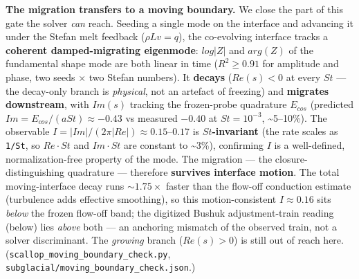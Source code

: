 \documentclass[tc, manuscript]{copernicus}
\begin{document}
\textbf{The migration transfers to a moving boundary.} We close the part of this gate the solver \emph{can} reach. Seeding a single mode on the interface and advancing it under the Stefan melt feedback ($\rho L v=q$), the co-evolving interface tracks a \textbf{coherent damped-migrating eigenmode}: $log|Z|$ and $arg(Z)$ of the fundamental shape mode are both linear in time ($R^{2}\ge 0.91$ for amplitude and phase, two seeds \ensuremath{\times} two Stefan numbers). It \textbf{decays} ($Re(s)<0$ at every $St$ — the decay-only branch is \emph{physical}, not an artefact of freezing) and \textbf{migrates downstream}, with $Im(s)$ tracking the frozen-probe quadrature $E_{cos}$ (predicted $Im=E_{cos}/(aSt)\approx -0.43$ vs measured $-0.40$ at $St=10^{-3}$, \textasciitilde{}5–10\%). The observable $I=|Im|/(2\pi |Re|)\approx 0.15\mbox{--}0.17$ is \textbf{$St$-invariant} (the rate scales as \texttt{1/\allowbreak{}St}, so $Re\cdot St$ and $Im\cdot St$ are constant to \textasciitilde{}3\%), confirming $I$ is a well-defined, normalization-free property of the mode. The migration — the closure-distinguishing quadrature — therefore \textbf{survives interface motion}. The total moving-interface decay runs $\sim 1.75\times $ faster than the flow-off conduction estimate (turbulence adds effective smoothing), so this motion-consistent $I\approx 0.16$ sits \emph{below} the frozen flow-off band; the digitized Bushuk adjustment-train reading (below) lies \emph{above} both — an anchoring mismatch of the observed train, not a solver discriminant. The \emph{growing} branch ($Re(s)>0$) is still out of reach here. (\texttt{scallop\_\allowbreak{}moving\_\allowbreak{}boundary\_\allowbreak{}check.\allowbreak{}py}, \texttt{subglacial/\allowbreak{}moving\_\allowbreak{}boundary\_\allowbreak{}check.\allowbreak{}json}.)
\end{document}
